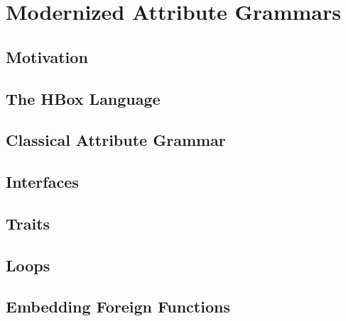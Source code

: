 \chapter{Modernized Attribute Grammars}

\section{Motivation}
\section{The HBox Language}
\section{Classical Attribute Grammar}
\section{Interfaces}
\section{Traits}
\section{Loops}
\section{Embedding Foreign Functions}

